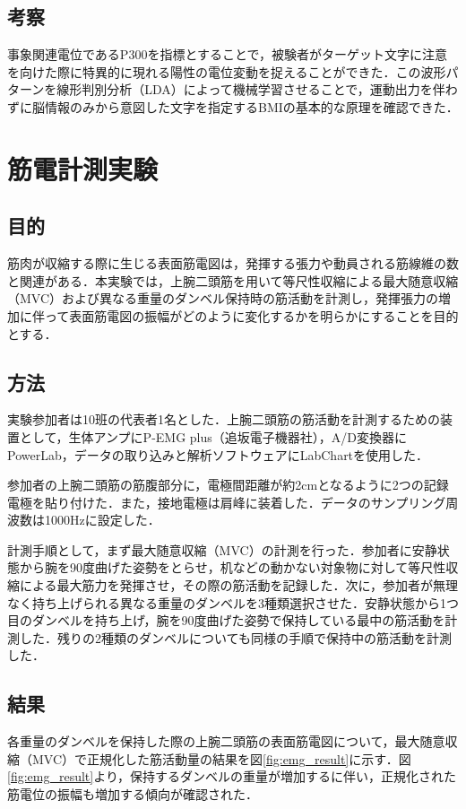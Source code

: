 \documentclass[paper=a4, fontsize=10pt]{jlreq}
\begin{document}
\subsection{考察}
事象関連電位であるP300を指標とすることで，被験者がターゲット文字に注意を向けた際に特異的に現れる陽性の電位変動を捉えることができた．この波形パターンを線形判別分析（LDA）によって機械学習させることで，運動出力を伴わずに脳情報のみから意図した文字を指定するBMIの基本的な原理を確認できた．

\section{筋電計測実験}
\subsection{目的}
筋肉が収縮する際に生じる表面筋電図は，発揮する張力や動員される筋線維の数と関連がある\cite{sakaimed_emg}．本実験では，上腕二頭筋を用いて等尺性収縮による最大随意収縮（MVC）および異なる重量のダンベル保持時の筋活動を計測し，発揮張力の増加に伴って表面筋電図の振幅がどのように変化するかを明らかにすることを目的とする．

\subsection{方法}
実験参加者は10班の代表者1名とした．上腕二頭筋の筋活動を計測するための装置として，生体アンプにP-EMG plus（追坂電子機器社），A/D変換器にPowerLab，データの取り込みと解析ソフトウェアにLabChartを使用した．

参加者の上腕二頭筋の筋腹部分に，電極間距離が約2cmとなるように2つの記録電極を貼り付けた．また，接地電極は肩峰に装着した．データのサンプリング周波数は1000Hzに設定した．

計測手順として，まず最大随意収縮（MVC）の計測を行った．参加者に安静状態から腕を90度曲げた姿勢をとらせ，机などの動かない対象物に対して等尺性収縮による最大筋力を発揮させ，その際の筋活動を記録した．次に，参加者が無理なく持ち上げられる異なる重量のダンベルを3種類選択させた．安静状態から1つ目のダンベルを持ち上げ，腕を90度曲げた姿勢で保持している最中の筋活動を計測した．残りの2種類のダンベルについても同様の手順で保持中の筋活動を計測した．

\subsection{結果}
各重量のダンベルを保持した際の上腕二頭筋の表面筋電図について，最大随意収縮（MVC）で正規化した筋活動量の結果を図\ref{fig:emg_result}に示す．図\ref{fig:emg_result}より，保持するダンベルの重量が増加するに伴い，正規化された筋電位の振幅も増加する傾向が確認された．
\end{document}
